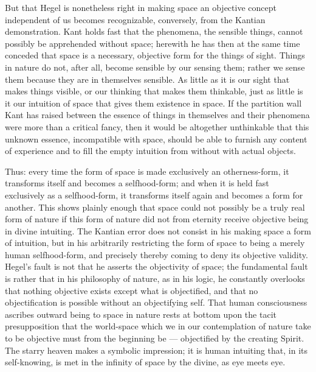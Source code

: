 \documentclass[12pt,a4paper]{book}
\begin{document}
But that Hegel is nonetheless right in making space an objective concept
independent of us becomes recognizable, conversely, from the Kantian
demonstration. Kant holds fast
that the phenomena, the sensible things, cannot possibly be apprehended without
space; herewith he has then at the same time conceded that space is a necessary,
objective form for the things of sight. Things in nature do not, after all,
become sensible by our sensing them; rather we sense them because they are in
themselves sensible. As little as it is our sight that makes things visible, or
our thinking that makes them thinkable, just as little is it our intuition of
space that gives them existence in space. If the partition wall Kant has raised
between the essence of things in themselves and their phenomena were more than a
critical fancy, then it would be altogether unthinkable that this unknown
essence, incompatible with space, should be able to furnish any content of
experience and to fill the empty intuition from without with actual objects.

Thus: every time the form of space is made exclusively an otherness-form, it
transforms itself and becomes a selfhood-form; and when it is held fast
exclusively as a selfhood-form, it transforms itself again and becomes a form
for another. This shows plainly enough that space could not possibly be a truly
real form of nature if this form of nature did not from eternity receive
objective being in divine intuiting. The Kantian error does not consist in his
making space a form of intuition, but in his arbitrarily restricting the form of
space to being a merely human selfhood-form, and precisely thereby coming to
deny its objective validity. Hegel's fault is not that he asserts the
objectivity of space; the fundamental fault is rather that in his philosophy of
nature, as in his logic, he constantly overlooks that nothing objective exists
except what is objectified, and that no objectification is possible without an
objectifying self. That human consciousness ascribes outward being to space in
nature rests at bottom upon the tacit presupposition that the world-space which
we in our contemplation of nature take to be objective must from the beginning
be ---
objectified by the creating Spirit. The starry heaven makes a symbolic
impression; it is human intuiting that, in its self-knowing, is met in the
infinity of space by the divine, as eye meets eye.
\end{document}
